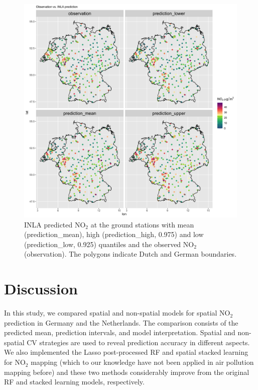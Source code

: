 \documentclass{article}
\begin{document}
\begin{figure}[!htb]
\centering
\includegraphics[scale =0.12]{fig/pred_11var.png}
\caption{INLA predicted NO$_2$ at the ground stations with mean (prediction\_mean), high (prediction\_high, 0.975) and low (prediction\_low, 0.925) quantiles and the observed NO$_2$ (observation). The polygons indicate Dutch and German boundaries.}
\label{INLApred}
\end{figure}


\newpage

\section{Discussion}
In this study, we compared spatial and non-spatial models for spatial NO$_2$ prediction in Germany and the Netherlands. The comparison consists of the predicted mean, prediction intervals, and model interpretation. Spatial and non-spatial CV strategies are used to reveal prediction accuracy in different aspects. We also implemented the Lasso post-processed RF and spatial stacked learning for NO$_2$ mapping (which to our knowledge have not been applied in air pollution mapping before) and these two methods considerably improve from the original RF and stacked learning models, respectively. %
\end{document}

